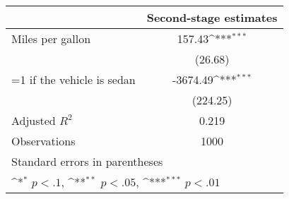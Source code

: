 {
\def\sym#1{\ifmmode^{#1}\else\(^{#1}\)\fi}
\begin{tabular}{l*{1}{c}}
\hline\hline
                    &\multicolumn{1}{c}{Second-stage estimates}\\
\hline
Miles per gallon    &      157.43\sym{***}\\
                    &     (26.68)         \\
[1em]
=1 if the vehicle is sedan&    -3674.49\sym{***}\\
                    &    (224.25)         \\
\hline
Adjusted \(R^{2}\)  &       0.219         \\
Observations        &        1000         \\
\hline\hline
\multicolumn{2}{l}{\footnotesize Standard errors in parentheses}\\
\multicolumn{2}{l}{\footnotesize \sym{*} \(p<.1\), \sym{**} \(p<.05\), \sym{***} \(p<.01\)}\\
\end{tabular}
}
